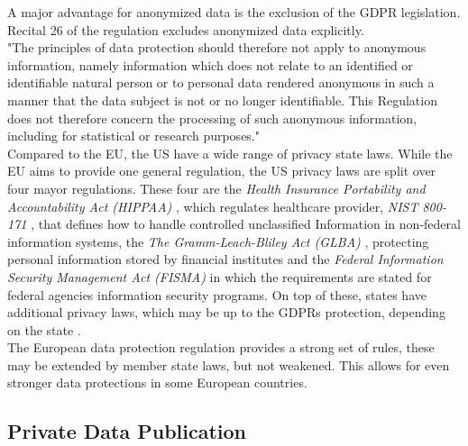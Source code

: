         A major advantage for anonymized data is the exclusion of the GDPR legislation. Recital 26 of the regulation excludes anonymized data explicitly.\\ 
        "The principles of data protection should therefore not apply to anonymous information, namely information which does not relate to an identified or identifiable natural person or to personal data rendered anonymous in such a manner that the data subject is not or no longer identifiable. This Regulation does not therefore concern the processing of such anonymous information, including for statistical or research purposes." \cite{european_union_regulation_2016}\\
        Compared to the EU, the US have a wide range of privacy state laws. While the EU aims to provide one general regulation, the US privacy laws are split over four mayor regulations.
        These four are the \textit{Health Insurance Portability and Accountability Act (HIPPAA)} \cite{rights_ocr_summary_2009}, which regulates healthcare provider, \textit{NIST 800-171} \cite{ross_protecting_2015}, that defines how to handle controlled unclassified Information in non-federal information systems, the \textit{The Gramm-Leach-Bliley Act (GLBA)} \cite{noauthor_gramm-leach-bliley_2013}, protecting personal information stored by financial institutes and the \textit{Federal Information Security Management Act (FISMA)} \cite{carper_s2521_2014} in which the requirements are stated for federal agencies information security programs. On top of these, states have additional privacy laws, which may be up to the GDPRs protection, depending on the state \cite{andrada_coos_eu_nodate}.\\
        The European data protection regulation provides a strong set of rules, these may be extended by member state laws, but not weakened. This allows for even stronger data protections in some European countries.
        
    \subsection{Private Data Publication}
        \label{subsec:related:private_data_analysis}
    

